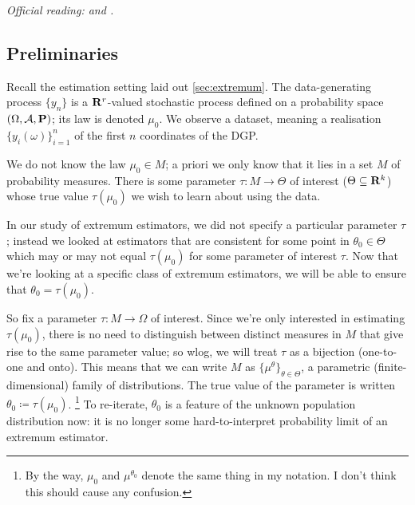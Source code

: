 \documentclass[11pt,letterpaper,reqno,oneside]{article}
\begin{document}
\emph{%
Official reading: \textcite[][sec. 4.2.1--4.2.3]{Amemiya1985} and \textcite[][sec. 2.2.1, 2.4, 3.2, 3.3, and 4.2]{NeweyMcfadden1994}.}



\subsection{Preliminaries}
\label{sec:MLE:preliminaries}

Recall the estimation setting laid out \cref{sec:extremum}. The data-generating process $\{ y_n \}$ is a $\mathbf{R}^r$-valued stochastic process defined on a probability space $(\Omega,\mathcal{A},\mathbf{P})$; its law is denoted $\mu_0$. We observe a dataset, meaning a realisation $\{ y_i(\omega) \}_{i=1}^n$ of the first $n$ coordinates of the DGP.

We do not know the law $\mu_0 \in M$; a priori we only know that it lies in a set $M$ of probability measures. There is some parameter $\tau : M \to \Theta$ of interest ($\Theta \subseteq \mathbf{R}^k$) whose true value $\tau(\mu_0)$ we wish to learn about using the data.

In our study of extremum estimators, we did not specify a particular parameter $\tau$; instead we looked at estimators that are consistent for some point in $\theta_0 \in \Theta$ which may or may not equal $\tau(\mu_0)$ for some parameter of interest $\tau$. Now that we're looking at a specific class of extremum estimators, we will be able to ensure that $\theta_0 = \tau(\mu_0)$.

So fix a parameter $\tau : M \to \Omega$ of interest. Since we're only interested in estimating $\tau(\mu_0)$, there is no need to distinguish between distinct measures in $M$ that give rise to the same parameter value; so wlog, we will treat $\tau$ as a bijection (one-to-one and onto). This means that we can write $M$ as $\{ \mu^\theta \}_{\theta \in \Theta}$, a parametric (finite-dimensional) family of distributions. The true value of the parameter is written $\theta_0 \coloneqq \tau(\mu_0)$.%
	\footnote{By the way, $\mu_0$ and $\mu^{\theta_0}$ denote the same thing in my notation. I don't think this should cause any confusion.}
To re-iterate, $\theta_0$ is a feature of the unknown population distribution now: it is no longer some hard-to-interpret probability limit of an extremum estimator.
\end{document}
